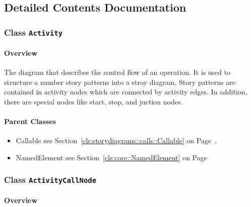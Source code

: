 			
		



\subsection{Detailed Contents Documentation}
\subsubsection{\Large{Class \bfseries \texttt{Activity}\normalfont}}
\label{cls:storydiagrams::activities::Activity} 
\paragraph{Overview}

	
			
The diagram that describes the control flow of an operation. It is used to structure a number story patterns into a stroy diagram. Story patterns are contained in activity nodes which are connected by activity edges. In addition, there are special nodes like start, stop, and juction nodes.  	
		
	



\paragraph{Parent Classes}
\begin{itemize}
\item Callable see Section~\ref{cls:storydiagrams::calls::Callable} on Page~\pageref{cls:storydiagrams::calls::Callable}, \item NamedElement see Section~\ref{cls:core::NamedElement} on Page~\pageref{cls:core::NamedElement}\end{itemize}
\subsubsection{\Large{Class \bfseries \texttt{ActivityCallNode}\normalfont}}
\label{cls:storydiagrams::activities::ActivityCallNode} 
\paragraph{Overview}

	
			
